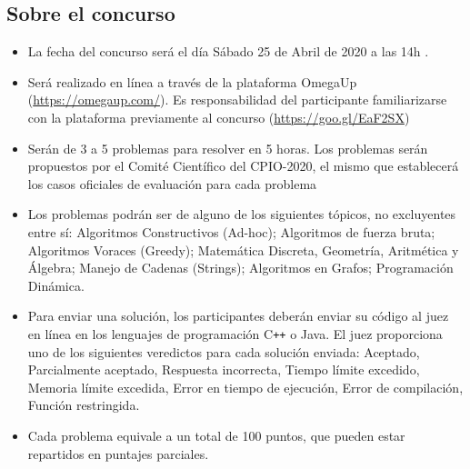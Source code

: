 \documentclass{article}
\begin{document}

\subsection{Sobre el concurso}

\begin{itemize}
    \item La fecha del concurso será el día {\color{red} Sábado 25 de Abril de 2020 a las 14h} . 

    
      \item Será realizado en línea a través de la plataforma OmegaUp (\url{https://omegaup.com/}).
    Es responsabilidad del participante familiarizarse con la plataforma previamente al concurso (\url{https://goo.gl/EaF2SX})
    
   \item Serán de 3 a 5 problemas para resolver en 5 horas.
   Los problemas serán propuestos por el Comité Científico del CPIO-2020, el mismo que establecerá los casos oficiales de evaluación para cada problema
   
    \item Los problemas podrán ser de alguno de los siguientes tópicos, no excluyentes entre sí:
Algoritmos Constructivos (Ad-hoc);
Algoritmos de fuerza bruta;
Algoritmos Voraces (Greedy);
Matemática Discreta,
Geometría, Aritmética y Álgebra;
Manejo de Cadenas (Strings);
Algoritmos en Grafos;
Programación Dinámica.

 \item 
 Para enviar una solución, los participantes deberán enviar su código al juez en línea en los lenguajes de programación C\texttt{++}  o Java.
El juez proporciona uno de los siguientes veredictos para cada solución enviada:
Aceptado,
Parcialmente aceptado,
Respuesta incorrecta,
Tiempo límite excedido,
Memoria límite excedida,
Error en tiempo de ejecución,
Error de compilación,
Función restringida.

\item

Cada problema equivale a un total de 100 puntos, que pueden estar repartidos en puntajes parciales.


\end{itemize}
\end{document}
